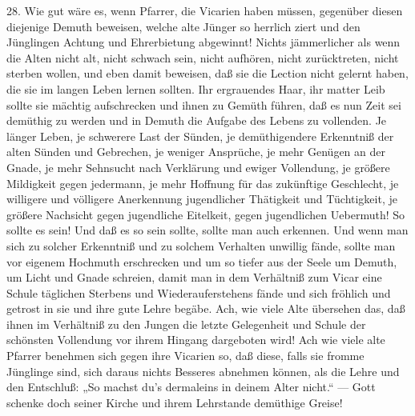 28. Wie gut wäre es, wenn Pfarrer, die Vicarien haben müssen, gegenüber diesen diejenige Demuth beweisen, welche alte Jünger so herrlich ziert und den Jünglingen Achtung und Ehrerbietung abgewinnt! Nichts jämmerlicher als wenn die Alten nicht alt, nicht schwach sein, nicht aufhören, nicht zurücktreten, nicht sterben wollen, und eben damit beweisen, daß sie die Lection nicht gelernt haben, die sie im langen Leben lernen sollten. Ihr ergrauendes Haar, ihr matter Leib sollte sie mächtig aufschrecken und ihnen zu Gemüth führen, daß es nun Zeit sei demüthig zu werden und in Demuth die Aufgabe des Lebens zu vollenden. Je länger Leben, je schwerere Last der Sünden, je demüthigendere Erkenntniß der alten Sünden und Gebrechen, je weniger Ansprüche, je mehr Genügen an der
Gnade, je mehr Sehnsucht nach Verklärung und ewiger Vollendung, je größere Mildigkeit gegen jedermann, je mehr Hoffnung für das zukünftige Geschlecht, je willigere und völligere Anerkennung jugendlicher Thätigkeit und Tüchtigkeit, je größere Nachsicht gegen jugendliche Eitelkeit, gegen jugendlichen Uebermuth! So sollte es sein! Und daß es so sein sollte, sollte man auch erkennen. Und wenn man sich zu solcher Erkenntniß und zu solchem Verhalten unwillig fände, sollte man vor eigenem Hochmuth erschrecken und um so tiefer aus der Seele um Demuth, um Licht und Gnade schreien, damit man in dem Verhältniß zum Vicar eine Schule täglichen Sterbens und Wiederauferstehens fände und sich fröhlich und getrost in sie und ihre gute Lehre begäbe. Ach, wie viele Alte übersehen das, daß ihnen im Verhältniß zu den Jungen die letzte Gelegenheit und Schule der schönsten Vollendung vor ihrem Hingang dargeboten wird! Ach wie viele alte Pfarrer benehmen sich gegen ihre Vicarien so, daß diese, falls sie fromme Jünglinge sind, sich daraus nichts Besseres abnehmen können, als die Lehre und den Entschluß: „So machst du’s dermaleins in deinem Alter nicht.“ — Gott schenke doch seiner Kirche und ihrem Lehrstande demüthige Greise!

